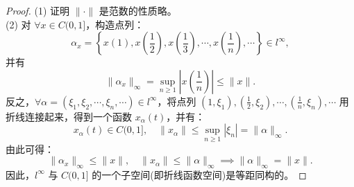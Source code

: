 \documentclass[lang=cn,newtx,10pt,scheme=chinese,thmcnt=chapter]{elegantbook}
\begin{document}
\begin{proof}
(1) 证明 $\|\cdot\|$ 是范数的性质略。\\
(2) 对 $\forall x \in C(0,1]$，构造点列：
\[
\alpha_x = \left\{ x(1), x\left(\frac{1}{2}\right), x\left(\frac{1}{3}\right), \cdots, x\left(\frac{1}{n}\right), \cdots \right\} \in l^\infty,
\]
并有
\[
\|\alpha_x\|_\infty = \sup_{n \geqslant 1} \left| x\left( \frac{1}{n} \right) \right| \leqslant \|x\|.
\]
反之，$\forall \alpha = \left( \xi_1, \xi_2, \cdots, \xi_n, \cdots \right) \in l^\infty$，将点列 $\left(1, \xi_1\right), \left(\frac{1}{2}, \xi_2\right), \cdots, \left(\frac{1}{n}, \xi_n\right), \cdots$ 用折线连接起来，得到一个函数 $x_\alpha(t)$，并有：
\[
x_\alpha(t) \in C(0,1], \quad \|x_\alpha\| \leqslant \sup_{n \geqslant 1} |\xi_n| = \|\alpha\|_\infty.
\]
由此可得：
\[
\|\alpha_x\|_\infty \leqslant \|x\|, \quad \|x_\alpha\| \leqslant \|\alpha\|_\infty \implies \|\alpha\|_\infty = \|x\|.
\]
因此，$l^\infty$ 与 $C(0,1]$ 的一个子空间(即折线函数空间)是等距同构的。
\end{proof}
\end{document}
